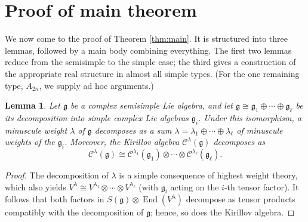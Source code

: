 \documentclass{amsart}
\newcommand{\Kir}{\mathcal{C}}
\newcommand{\End}{\operatorname{End}}
\newcommand{\g}{\mathfrak{g}}
\theoremstyle{definition}
\theoremstyle{plain}
\newtheorem{lem}[defn]{Lemma}
\theoremstyle{remark}
\begin{document}
\section{Proof of main theorem}
\label{sec:main_proof}
We now come to the proof of Theorem \ref{thm:main}. It is structured into three lemmas, followed by a main body combining everything. The first two lemmas reduce from the semisimple to the simple case; the third gives a construction of the appropriate real structure in almost all simple types. (For the one remaining type, $A_{2n}$, we supply ad hoc arguments.)
\begin{lem}
\label{lem:kirillov_decomp}
    Let $\g$ be a complex semisimple Lie algebra, and let $\g\cong \g_1 \oplus \cdots \oplus \g_\ell$ be its decomposition into simple complex Lie algebras $\g_i$. Under this isomorphism, a minuscule weight $\lambda$ of $\g$ decomposes as a sum $\lambda = \lambda_1 \oplus \cdots \oplus \lambda_\ell$ of minuscule weights of the $\g_i$. Moreover, the Kirillov algebra $\Kir^\lambda(\g)$ decomposes as
    $$
        \Kir^\lambda(\g)
        \cong
        \Kir^{\lambda_1}(\g_1) 
        \otimes \cdots \otimes
        \Kir^{\lambda_\ell}(\g_\ell).
    $$
\end{lem}
\begin{proof}
    The decomposition of $\lambda$ is a simple consequence of highest weight theory, which also yields $V^\lambda \cong V^{\lambda_1}\otimes \cdots \otimes V^{\lambda_\ell}$ (with $\g_i$ acting on the $i$-th tensor factor). It follows that both factors in $S(\g)\otimes \End(V^\lambda)$ decompose as tensor products compatibly with the decomposition of $\g$; hence, so does the Kirillov algebra.
\end{proof}
\end{document}
